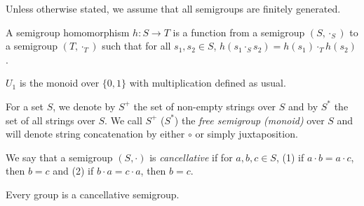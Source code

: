 \documentclass[a4paper,UKenglish,cleveref, autoref, thm-restate, anonymous]{lipics-v2021}
\begin{document}
\begin{remark}
    Unless otherwise stated, we assume that all semigroups are finitely generated.
\end{remark}

\begin{definition}
    A semigroup homomorphism $h : S \rightarrow T$ is a function from a semigroup $(S, \cdot_S)$ to a semigroup $(T, \cdot_T)$ such that for all $s_1, s_2 \in S$, $h(s_1 \cdot_S s_2) = h(s_1) \cdot_T h(s_2)$.
\end{definition}

\iffalse
TODO: remove / move elsewhere
\begin{definition}
    A semigroup $S'$ is a \emph{subsemigroup} of a semigroup $(S, \cdot)$, denoted $S' \leq S$, if it is isomorphic to a semigroup $(S'', \cdot)$ where $S'' \subseteq S$.
\end{definition}

\begin{definition}
    A semigroup $S'$ \emph{divides} a semigroup $S$, denoted $S' \preceq S$, if there exists a subsemigroup $S''$ of $S$ and a surjective homomorphism from $S''$ onto $S'$. In other words, $S'$ divides $S$ if $S'$ is the homomorphic image of a subsemigroup of $S$.
\end{definition}
\fi

\begin{definition}
    $U_1$ is the monoid over $\{0,1\}$ with multiplication defined as usual.
\end{definition}

\begin{definition}
    For a set $S$, we denote by $S^+$ the set of non-empty strings over $S$ and by $S^*$ the set of all strings over $S$. We call $S^+$ ($S^*$) the \emph{free semigroup (monoid)} over $S$ and will denote string concatenation by either $\circ$ or simply juxtaposition.
\end{definition}

\begin{definition}
    We say that a semigroup $(S, \cdot)$ is \emph{cancellative} if for $a,b,c \in S$, (1) if $a \cdot b = a \cdot c$, then $b = c$ and (2) if $b \cdot a = c \cdot a$, then $b = c$. 
\end{definition}

\begin{proposition}\label{prop:groupcanc}
    Every group is a cancellative semigroup.
\end{proposition}
\end{document}
